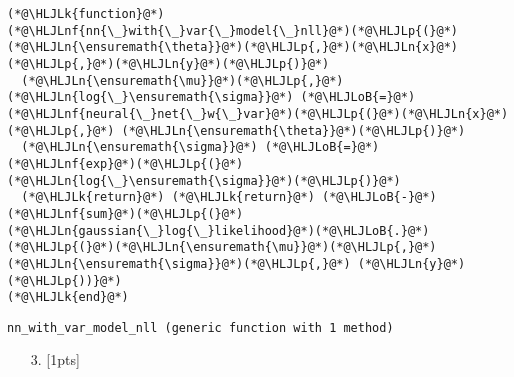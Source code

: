 \documentclass[12pt,a4paper]{article}
\newcommand{\HLJLk}[1]{\textcolor[RGB]{148,91,176}{\textbf{#1}}}
\newcommand{\HLJLn}[1]{#1}
\newcommand{\HLJLnf}[1]{\textcolor[RGB]{66,102,213}{#1}}
\newcommand{\HLJLoB}[1]{\textcolor[RGB]{102,102,102}{\textbf{#1}}}
\newcommand{\HLJLp}[1]{#1}
\begin{document}
\begin{lstlisting}
(*@\HLJLk{function}@*) (*@\HLJLnf{nn{\_}with{\_}var{\_}model{\_}nll}@*)(*@\HLJLp{(}@*)(*@\HLJLn{\ensuremath{\theta}}@*)(*@\HLJLp{,}@*)(*@\HLJLn{x}@*)(*@\HLJLp{,}@*)(*@\HLJLn{y}@*)(*@\HLJLp{)}@*)
  (*@\HLJLn{\ensuremath{\mu}}@*)(*@\HLJLp{,}@*)(*@\HLJLn{log{\_}\ensuremath{\sigma}}@*) (*@\HLJLoB{=}@*) (*@\HLJLnf{neural{\_}net{\_}w{\_}var}@*)(*@\HLJLp{(}@*)(*@\HLJLn{x}@*)(*@\HLJLp{,}@*) (*@\HLJLn{\ensuremath{\theta}}@*)(*@\HLJLp{)}@*)
  (*@\HLJLn{\ensuremath{\sigma}}@*) (*@\HLJLoB{=}@*) (*@\HLJLnf{exp}@*)(*@\HLJLp{(}@*)(*@\HLJLn{log{\_}\ensuremath{\sigma}}@*)(*@\HLJLp{)}@*)
  (*@\HLJLk{return}@*) (*@\HLJLk{return}@*) (*@\HLJLoB{-}@*)(*@\HLJLnf{sum}@*)(*@\HLJLp{(}@*)(*@\HLJLn{gaussian{\_}log{\_}likelihood}@*)(*@\HLJLoB{.}@*)(*@\HLJLp{(}@*)(*@\HLJLn{\ensuremath{\mu}}@*)(*@\HLJLp{,}@*) (*@\HLJLn{\ensuremath{\sigma}}@*)(*@\HLJLp{,}@*) (*@\HLJLn{y}@*)(*@\HLJLp{))}@*)
(*@\HLJLk{end}@*)
\end{lstlisting}

\begin{lstlisting}
nn_with_var_model_nll (generic function with 1 method)
\end{lstlisting}


\begin{itemize}
\item[3. ] [1pts]

\end{itemize}
\end{document}
